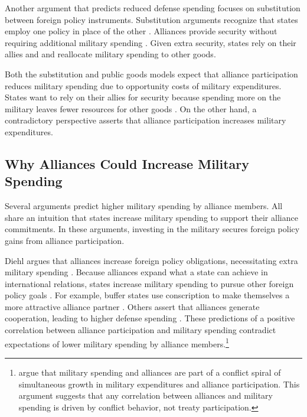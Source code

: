 \documentclass[12pt]{article}
\begin{document}
Another argument that predicts reduced defense spending focuses on substitution between foreign policy instruments.
Substitution arguments recognize that states employ one policy in place of the other \citep{MostStarr1989}.
Alliances provide security without requiring additional military spending \citep{Morrow1993, Conybeare1994}. 
Given extra security, states rely on their allies and and reallocate military spending to other goods. 


Both the substitution and public goods models expect that alliance participation reduces military spending due to opportunity costs of military expenditures. 
States want to rely on their allies for security because spending more on the military leaves fewer resources for other goods \citep{Fordham1998, Fearon2018}.
On the other hand, a contradictory perspective asserts that alliance participation increases military expenditures. 


\subsection{Why Alliances Could Increase Military Spending}


Several arguments predict higher military spending by alliance members.
All share an intuition that states increase military spending to support their alliance commitments. 
In these arguments, investing in the military secures foreign policy gains from alliance participation. 


Diehl argues that alliances increase foreign policy obligations, necessitating extra military spending \citep{Diehl1994}.
Because alliances expand what a state can achieve in international relations, states increase military spending to pursue other foreign policy goals \cite{MorganPalmer2006}.
For example, buffer states use conscription to make themselves a more attractive alliance partner \citep{Horowitzetal2017}.
Others assert that alliances generate cooperation, leading to higher defense spending \citep{Palmer1990, QuirozFlores2011}. 
These predictions of a positive correlation between alliance participation and military spending contradict expectations of lower military spending by alliance members.\footnote{
\citet{SeneseVasquez2008} argue that military spending and alliances are part of a conflict spiral of simultaneous growth in military expenditures and alliance participation. 
This argument suggests that any correlation between alliances and military spending is driven by conflict behavior, not treaty participation.
}
\end{document}
